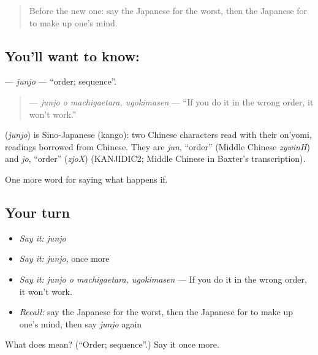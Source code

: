 \begin{quote}
Before the new one: say the Japanese for the worst, then the Japanese for to make up one's mind.
\end{quote}

\subsection*{You'll want to know: }
\textbf{} — \emph{junjo} — \textquotedblleft{}order; sequence\textquotedblright{}.

\begin{quote}
\textbf{ } — \emph{junjo o machigaetara, ugokimasen} — \textquotedblleft{}If you do it in the wrong order, it won't work.\textquotedblright{}
\end{quote}

\begin{cousinweb}
\textbf{} (\emph{junjo}) is Sino-Japanese (kango): two Chinese characters read with their on'yomi, readings borrowed from Chinese. They are \emph{jun}, \textquotedblleft{}order\textquotedblright{} (Middle Chinese \emph{zywinH}) and \emph{jo}, \textquotedblleft{}order\textquotedblright{} (\emph{zjoX}) (KANJIDIC2; Middle Chinese in Baxter's transcription).
\end{cousinweb}

\begin{grammarlens}[title={What you've built}]
One more word for saying what happens if.
\end{grammarlens}

\subsection*{Your turn}
\begin{itemize}
\raggedright
  \item \emph{Say it:} \emph{junjo}
  \item \emph{Say it:} \emph{junjo}, once more
  \item \emph{Say it:} \emph{junjo o machigaetara, ugokimasen} — If you do it in the wrong order, it won't work.
  \item \emph{Recall:} say the Japanese for the worst, then the Japanese for to make up one's mind, then say \emph{junjo} again
\end{itemize}

\begin{tcolorbox}[breakable,colback=teal!4,colframe=teal!35!black,title={Before you move on}]
What does  mean? (\textquotedblleft{}Order; sequence\textquotedblright{}.) Say it once more.
\end{tcolorbox}
